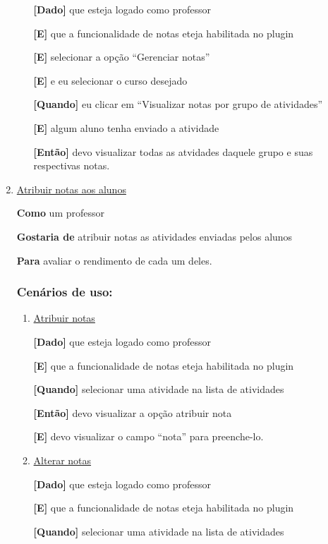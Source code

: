 \begin{enumerate}
\begin{enumerate}
\textbf{[Dado]} que esteja logado como professor

\textbf{[E]} que a funcionalidade de notas eteja habilitada no plugin

\textbf{[E]} selecionar a opção ``Gerenciar notas''

\textbf{[E]} e eu selecionar o curso desejado

\textbf{[Quando]} eu clicar em ``Visualizar notas por grupo de atividades''

\textbf{[E]} algum aluno tenha enviado a atividade

\textbf{[Então]} devo visualizar todas as atvidades daquele grupo e suas respectivas notas.

\end{enumerate}

\item \underline{Atribuir notas aos alunos}

\textbf{Como} um professor

\textbf{Gostaria de} atribuir notas as atividades enviadas pelos alunos

\textbf{Para} avaliar o rendimento de cada um deles.

\subsubsection*{Cenários de uso:}

\begin{enumerate}
\item \underline{Atribuir notas}

\textbf{[Dado]} que esteja logado como professor

\textbf{[E]} que a funcionalidade de notas eteja habilitada no plugin

\textbf{[Quando]} selecionar uma atividade na lista de atividades

\textbf{[Então]} devo visualizar a opção atribuir nota

\textbf{[E]} devo visualizar o campo ``nota'' para preenche-lo.


\item \underline{Alterar notas}

\textbf{[Dado]} que esteja logado como professor

\textbf{[E]} que a funcionalidade de notas eteja habilitada no plugin

\textbf{[Quando]} selecionar uma atividade na lista de atividades


\end{enumerate}
\end{enumerate}

